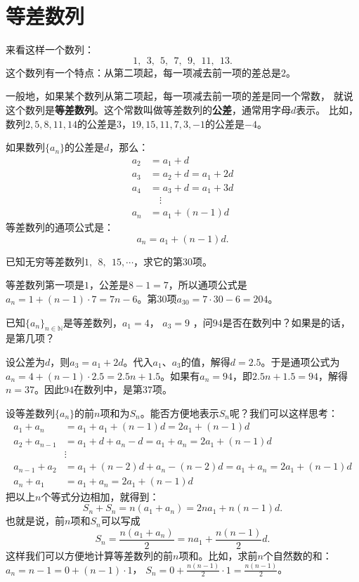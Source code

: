 \documentclass[12pt,UTF8,fontset=none]{ctexbook}
\begin{document}
\section{等差数列}
来看这样一个数列：
$$ 1,\;\,3,\;\,5,\;\,7,\;\,9,\;\,11,\;\, 13. $$
这个数列有一个特点：从第二项起，每一项减去前一项的差总是$2$。

一般地，如果某个数列从第二项起，每一项减去前一项的差是同一个常数，
就说这个数列是\textbf{等差数列}。这个常数叫做等差数列的\textbf{公差}，通常用字母$d$表示。
比如，数列$2,5,8,11,14$的公差是$3$，$19,15,11,7,3,-1$的公差是$-4$。

如果数列$\{a_n\}$的公差是$d$，那么：
\begin{align*}
a_2 &= a_1 + d  \\
a_3 &= a_2 + d = a_1 + 2d  \\
a_4 &= a_3 + d = a_1 + 3d  \\
&\quad \vdots  \\
a_n &= a_1 + (n-1)d  
\end{align*}
等差数列的通项公式是：
$$a_n = a_1 + (n-1)d.$$
\begin{et}
已知无穷等差数列$1,\;\,8,\;\,15, \cdots$，求它的第$30$项。
\end{et}
\begin{so}
等差数列第一项是$1$，公差是$8-1=7$，所以通项公式是$a_n = 1 + (n-1)\cdot 7 = 7n - 6$。第$30$项$a_{30} = 7\cdot 30 - 6 = 204$。
\end{so}
\begin{et}
已知$\{a_n\}_{n\in\mathbb{N}}$是等差数列，$a_1 = 4$， $a_3 = 9$ ，问$94$是否在数列中？如果是的话，是第几项？
\end{et}
\begin{so}
设公差为$d$，则$a_3 = a_1 + 2d$。代入$a_1$、$a_3$的值，解得$d = 2.5$。于是通项公式为$a_n = 4 + (n-1)\cdot 2.5 = 2.5n + 1.5$。如果有$a_n = 94$，即$2.5n + 1.5=94$，解得$n = 37$。因此$94$在数列中，是第$37$项。
\end{so}

设等差数列$\{a_n\}$的前$n$项和为$S_n$。能否方便地表示$S_n$呢？我们可以这样思考：
\begin{align*}
a_{1} + a_{n} &= a_1 + a_1 + (n-1)d = 2a_1 + (n-1)d  \\
a_{2} + a_{n-1} &= a_1 + d + a_n - d = a_1 + a_n = 2a_1 + (n-1)d  \\
&\vdots  \\
a_{n-1} + a_{2} &= a_1 + (n-2)d + a_n - (n-2)d = a_1 + a_n =  2a_1 + (n-1)d  \\
a_{n} + a_{1} &= a_1 + a_n = 2a_1 + (n-1)d  
\end{align*}
把以上$n$个等式分边相加，就得到：
$$ S_n + S_n = n(a_1 + a_n) = 2na_1 + n(n-1)d. $$
也就是说，前$n$项和$S_n$可以写成
$$ S_n = \frac{n(a_1 + a_n)}{2} = na_1 + \frac{n(n-1)}{2}d. $$
这样我们可以方便地计算等差数列的前$n$项和。比如，求前$n$个自然数的和：$a_n = n-1 = 0 + (n-1)\cdot 1$，
$S_n = 0 + \frac{n(n-1)}{2}\cdot 1 = \frac{n(n-1)}{2}$。
\end{document}
